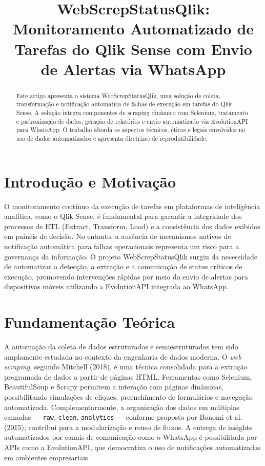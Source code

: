 \documentclass[conference]{IEEEtran}
\title{WebScrepStatusQlik: Monitoramento Automatizado de Tarefas do Qlik Sense com Envio de Alertas via WhatsApp}
\author{\IEEEauthorblockN{Wagner Filho}
\IEEEauthorblockA{Instituto de Pós-Graduação \\ Universidade Federal de Goiás \\ wagner.helio@discente.ufg.br}}
\begin{document}
\maketitle

\begin{abstract}
Este artigo apresenta o sistema WebScrepStatusQlik, uma solução de coleta, transformação e notificação automática de falhas de execução em tarefas do Qlik Sense. A solução integra componentes de scraping dinâmico com Selenium, tratamento e padronização de dados, geração de relatórios e envio automatizado via EvolutionAPI para WhatsApp. O trabalho aborda os aspectos técnicos, éticos e legais envolvidos no uso de dados automatizados e apresenta diretrizes de reprodutibilidade.
\end{abstract}

\section{Introdução e Motivação}
O monitoramento contínuo da execução de tarefas em plataformas de inteligência analítica, como o Qlik Sense, é fundamental para garantir a integridade dos processos de ETL (Extract, Transform, Load) e a consistência dos dados exibidos em painéis de decisão. No entanto, a ausência de mecanismos nativos de notificação automática para falhas operacionais representa um risco para a governança da informação. O projeto WebScrepStatusQlik surgiu da necessidade de automatizar a detecção, a extração e a comunicação de status críticos de execução, promovendo intervenções rápidas por meio do envio de alertas para dispositivos móveis utilizando a EvolutionAPI integrada ao WhatsApp.
\section{Fundamentação Teórica}
A automação da coleta de dados estruturados e semiestruturados tem sido amplamente estudada no contexto da engenharia de dados moderna. O \textit{web scraping}, segundo Mitchell (2018)\cite{mitchell2018web}, é uma técnica consolidada para a extração programada de dados a partir de páginas HTML. Ferramentas como Selenium, BeautifulSoup e Scrapy permitem a interação com páginas dinâmicas, possibilitando simulações de cliques, preenchimento de formulários e navegação automatizada. Complementarmente, a organização dos dados em múltiplas camadas — \texttt{raw}, \texttt{clean}, \texttt{analytics} — conforme proposto por Bonomi et al. (2015)\cite{bonomi2015data}, contribui para a modularização e reuso de fluxos. A entrega de insights automatizados por canais de comunicação como o WhatsApp é possibilitada por APIs como a EvolutionAPI, que democratiza o uso de notificações automatizadas em ambientes empresariais.
\end{document}
